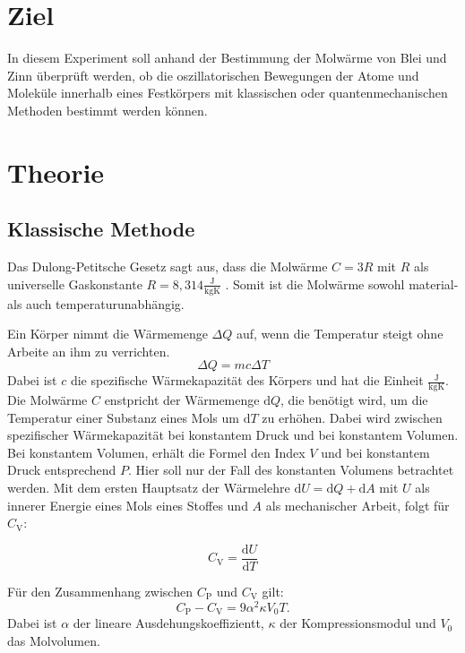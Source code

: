 \section{Ziel}
\label{sec:ziel}
In diesem Experiment soll anhand der Bestimmung der Molwärme von Blei und Zinn überprüft werden, ob die oszillatorischen Bewegungen der Atome und Moleküle innerhalb eines Festkörpers mit klassischen oder quantenmechanischen Methoden bestimmt werden können.

\section{Theorie}
\label{sec:theorie}

 \subsection{Klassische Methode}
Das Dulong-Petitsche Gesetz sagt aus, dass die Molwärme $C = 3R$ mit $R$ als universelle Gaskonstante $R = 8,314 \frac{\si{\joule}}{\si{\kilogram \kelvin}}$ \cite{codata}. Somit ist die Molwärme sowohl material- als auch temperaturunabhängig.

Ein Körper nimmt die Wärmemenge $\Delta Q$ auf, wenn die Temperatur steigt ohne Arbeite an ihm zu verrichten.
\begin{equation}
  \Delta Q = mc \Delta T
\end{equation}
Dabei ist $c$ die spezifische Wärmekapazität des Körpers und hat die Einheit $\frac{\si{\joule}}{\si{\kilogram \kelvin}}$.
Die Molwärme $C$ enstpricht der Wärmemenge $\mathrm{d}Q$, die benötigt wird, um die Temperatur einer Substanz eines Mols um $\mathrm{d}T$ zu erhöhen. Dabei wird zwischen spezifischer Wärmekapazität bei konstantem Druck und bei konstantem Volumen. Bei konstantem Volumen, erhält die Formel den Index $V$ und bei konstantem Druck entsprechend $P$. Hier soll nur der Fall des konstanten Volumens betrachtet werden.
Mit dem ersten Hauptsatz der Wärmelehre $\mathrm{d}U = \mathrm{d}Q + \mathrm{d}A$ mit $U$ als innerer Energie eines Mols eines Stoffes und $A$ als mechanischer Arbeit, folgt für $C_\mathrm{V}$:

\begin{equation}
  C_\mathrm{V} = \frac{\mathrm{d}U}{\mathrm{d}T}
\end{equation}

Für den Zusammenhang zwischen $C_\mathrm{P}$ und $C_\mathrm{V}$ gilt:
\begin{equation}
  C_\mathrm{P}-C_\mathrm{V} = 9 \alpha^2\kappa V_0 T.
\end{equation}
Dabei ist $\alpha$ der lineare Ausdehungskoeffizientt, $\kappa$ der Kompressionsmodul und $V_0$ das Molvolumen.

